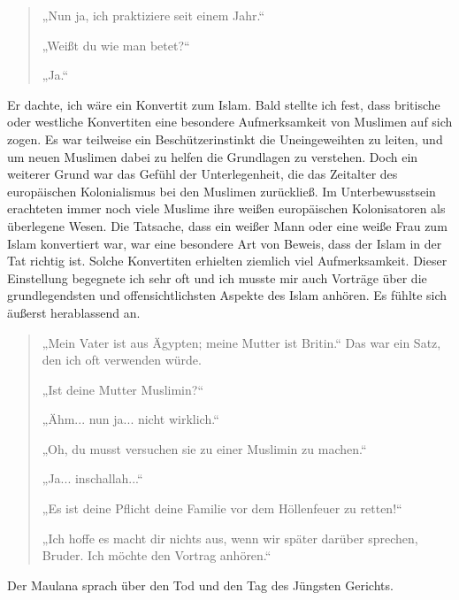 \documentclass[12pt]{memoir}
\begin{document}
\begin{quote}
„Nun ja, ich praktiziere seit einem Jahr.“

„Weißt du wie man betet?“

„Ja.“
\end{quote}

Er dachte, ich wäre ein Konvertit zum Islam.
Bald stellte ich fest, dass britische oder westliche Konvertiten
eine besondere Aufmerksamkeit von Muslimen auf sich zogen.
Es war teilweise ein Beschützerinstinkt die Uneingeweihten zu leiten,
und um neuen Muslimen dabei zu helfen die Grundlagen zu verstehen.
Doch ein weiterer Grund war das Gefühl der Unterlegenheit,
die das Zeitalter des europäischen Kolonialismus bei den Muslimen zurückließ.
Im Unterbewusstsein erachteten immer noch viele Muslime
ihre weißen europäischen Kolonisatoren als überlegene Wesen.
Die Tatsache, dass ein weißer Mann oder eine weiße Frau
zum Islam konvertiert war, war eine besondere Art von Beweis,
dass der Islam in der Tat richtig ist.
Solche Konvertiten erhielten ziemlich viel Aufmerksamkeit.
Dieser Einstellung begegnete ich sehr oft und ich musste mir auch Vorträge
über die grundlegendsten und offensichtlichsten Aspekte des Islam anhören.
Es fühlte sich äußerst herablassend an.

\begin{quote}
„Mein Vater ist aus Ägypten; meine Mutter ist Britin.“
Das war ein Satz, den ich oft verwenden würde.

„Ist deine Mutter Muslimin?“

„Ähm... nun ja... nicht wirklich.“

„Oh, du musst versuchen sie zu einer Muslimin zu machen.“

„Ja... inschallah...“

„Es ist deine Pflicht deine Familie vor dem Höllenfeuer zu retten!“

„Ich hoffe es macht dir nichts aus, wenn wir später darüber sprechen, Bruder.
Ich möchte den Vortrag anhören.“
\end{quote}

Der Maulana sprach über den Tod und den Tag des Jüngsten Gerichts.
\end{document}
